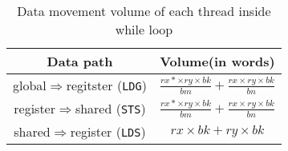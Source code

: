 \begin{table}[!t]
\caption{Data movement volume of each thread inside while loop}
\centering
\scalebox{1.0} {
\begin{tabular}{|c|c|}
\hline
    Data path& Volume(in words)\\
\hline
    global$\Rightarrow$regitster ({\tt LDG})& $\frac{rx*\times ry \times bk}{bm} + \frac{rx\times ry \times bk}{bn}$ \\
\hline
register$\Rightarrow$shared ({\tt STS})& $\frac{rx*\times ry \times bk}{bm} + \frac{rx\times ry \times bk}{bn}$ \\
\hline
shared$\Rightarrow$register ({\tt LDS})& $rx\times bk + ry\times bk$\\
\hline
\end{tabular}
}
\label{tab:reg}
\end{table}
